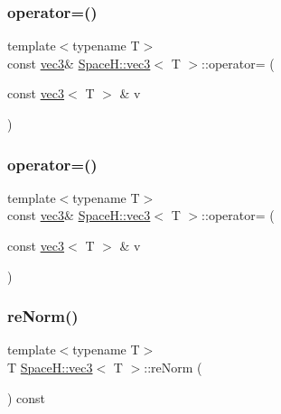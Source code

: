 \subsubsection{\texorpdfstring{operator=()}{operator=()}\hspace{0.1cm}{\footnotesize\ttfamily [3/4]}}
{\footnotesize\ttfamily template$<$typename T$>$ \\
const \mbox{\hyperlink{struct_space_h_1_1vec3}{vec3}}\& \mbox{\hyperlink{struct_space_h_1_1vec3}{Space\+H\+::vec3}}$<$ T $>$\+::operator= (\begin{DoxyParamCaption}\item[{const \mbox{\hyperlink{struct_space_h_1_1vec3}{vec3}}$<$ T $>$ \&}]{v }\end{DoxyParamCaption})\hspace{0.3cm}{\ttfamily [inline]}}

\mbox{\label{struct_space_h_1_1vec3_a958945cd614424f1c11daf9397370f6a}} 
\subsubsection{\texorpdfstring{operator=()}{operator=()}\hspace{0.1cm}{\footnotesize\ttfamily [4/4]}}
{\footnotesize\ttfamily template$<$typename T$>$ \\
const \mbox{\hyperlink{struct_space_h_1_1vec3}{vec3}}\& \mbox{\hyperlink{struct_space_h_1_1vec3}{Space\+H\+::vec3}}$<$ T $>$\+::operator= (\begin{DoxyParamCaption}\item[{const \mbox{\hyperlink{struct_space_h_1_1vec3}{vec3}}$<$ T $>$ \&}]{v }\end{DoxyParamCaption})\hspace{0.3cm}{\ttfamily [inline]}}

\mbox{\label{struct_space_h_1_1vec3_a90d3f8ac98cf17cb20986997daaf9e0e}} 
\subsubsection{\texorpdfstring{re\+Norm()}{reNorm()}\hspace{0.1cm}{\footnotesize\ttfamily [1/4]}}
{\footnotesize\ttfamily template$<$typename T$>$ \\
T \mbox{\hyperlink{struct_space_h_1_1vec3}{Space\+H\+::vec3}}$<$ T $>$\+::re\+Norm (\begin{DoxyParamCaption}{ }\end{DoxyParamCaption}) const\hspace{0.3cm}{\ttfamily [inline]}}



